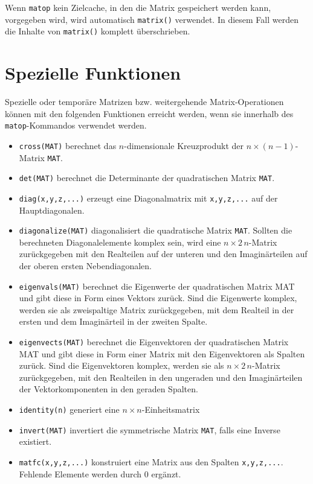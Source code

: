 \documentclass[DIV=14,headsepline,footsepline]{scrbook}
\begin{document}
				Wenn \lstinline+matop+ kein Zielcache, in den die Matrix gespeichert werden kann, vorgegeben wird, wird automatisch \lstinline+matrix()+ verwendet. In diesem Fall werden die Inhalte von \lstinline+matrix()+ komplett überschrieben.
				
			\section{Spezielle Funktionen}
				Spezielle oder temporäre Matrizen bzw. weitergehende Matrix-Operationen können mit den folgenden Funktionen erreicht werden, wenn sie innerhalb des \lstinline+matop+-Kommandos verwendet werden.
				\begin{itemize}
					\item \lstinline+cross(MAT)+ berechnet das $n$-dimensionale Kreuzprodukt der $n\times(n-1)$-Matrix \lstinline+MAT+.
					\item \lstinline+det(MAT)+ berechnet die Determinante der quadratischen Matrix \lstinline+MAT+.
					\item \lstinline+diag(x,y,z,...)+ erzeugt eine Diagonalmatrix mit \lstinline+x,y,z,...+ auf der Hauptdiagonalen.
					\item \lstinline+diagonalize(MAT)+ diagonalisiert die quadratische Matrix \lstinline+MAT+. Sollten die berechneten Diagonalelemente komplex sein, wird eine $n\times2\,n$-Matrix zurückgegeben mit den Realteilen auf der unteren und den Imaginärteilen auf der oberen ersten Nebendiagonalen.
					\item \lstinline+eigenvals(MAT)+ berechnet die Eigenwerte der quadratischen Matrix MAT und gibt diese in Form eines Vektors zurück. Sind die Eigenwerte komplex, werden sie als zweispaltige Matrix zurückgegeben, mit dem Realteil in der ersten und dem Imaginärteil in der zweiten Spalte.
					\item \lstinline+eigenvects(MAT)+ berechnet die Eigenvektoren der quadratischen Matrix MAT und gibt diese in Form einer Matrix mit den Eigenvektoren als Spalten zurück. Sind die Eigenvektoren komplex, werden sie als $n \times 2\,n$-Matrix zurückgegeben, mit den Realteilen in den ungeraden und den Imaginärteilen der Vektorkomponenten in den geraden Spalten.
					\item \lstinline+identity(n)+ generiert eine $n\times n$-Einheitsmatrix
					\item \lstinline+invert(MAT)+ invertiert die symmetrische Matrix \lstinline+MAT+, falls eine Inverse existiert.
					\item \lstinline+matfc(x,y,z,...)+ konstruiert eine Matrix aus den Spalten \lstinline+x,y,z,...+. Fehlende Elemente werden durch 0 ergänzt.

\end{itemize}
\end{document}
